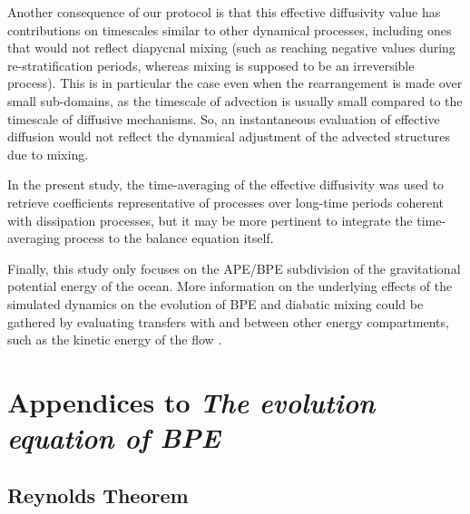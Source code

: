 Another consequence of our protocol is that this effective diffusivity value has contributions on timescales similar to other dynamical processes, including ones that would not reflect diapycnal mixing (such as reaching negative values \color{blue} during re-stratification periods\color{black}, whereas mixing is supposed to be an irreversible process). This is in particular the case even when the rearrangement is made over small sub-domains, as the timescale of advection is usually small compared to the timescale of diffusive mechanisms. So, an instantaneous evaluation of effective diffusion would not reflect the dynamical adjustment of the advected structures due to mixing.

In the present study, the time-averaging of the effective diffusivity was used to retrieve coefficients representative of processes over long-time periods coherent with dissipation processes, but it may be more pertinent to integrate the time-averaging process to the balance equation itself.


Finally, this study only focuses on the APE/BPE subdivision of the gravitational potential energy of the ocean. More information on the underlying effects of the simulated dynamics on the evolution of BPE and diabatic mixing could be gathered by evaluating transfers with and between other energy compartments, such as the kinetic energy of the flow \citep{floor_energy_2011}.
\color{black}

\color{blue}

\section{Appendices to \textit{The evolution equation of BPE}}

\subsection{Reynolds Theorem}
\label{annexe_reynolds}
